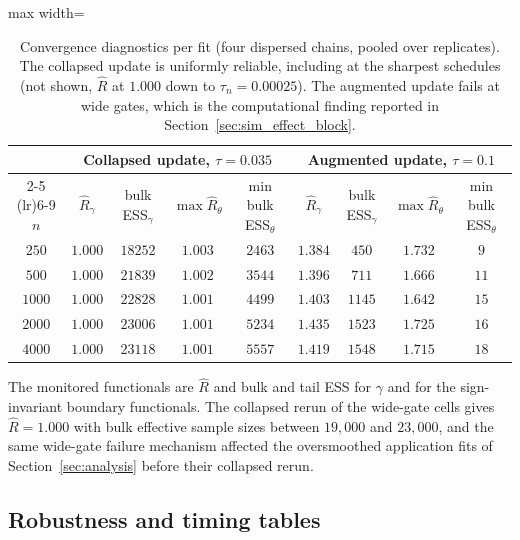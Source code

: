 \documentclass[11pt]{article}
\theoremstyle{definition}
\theoremstyle{plain}
\begin{document}
\begin{table}
  \centering
  \caption{Convergence diagnostics per fit (four dispersed chains, pooled over replicates). The collapsed update is uniformly reliable, including at the sharpest schedules (not shown, $\widehat R$ at $1.000$ down to $\tau_n=0.00025$). The augmented update fails at wide gates, which is the computational finding reported in Section~\ref{sec:sim_effect_block}.}
  \begin{adjustbox}{max width=\textwidth}
  \begin{tabular}{c cccc cccc}
    \toprule
    & \multicolumn{4}{c}{Collapsed update, $\tau=0.035$} & \multicolumn{4}{c}{Augmented update, $\tau=0.1$} \\
    \cmidrule(lr){2-5} \cmidrule(lr){6-9}
    $n$ & $\widehat R_\gamma$ & bulk ESS$_\gamma$ & $\max\widehat R_\theta$ & $\min$ bulk ESS$_\theta$ & $\widehat R_\gamma$ & bulk ESS$_\gamma$ & $\max\widehat R_\theta$ & $\min$ bulk ESS$_\theta$ \\
    \midrule
    $250$  & $1.000$ & $18252$ & $1.003$ & $2463$ & $1.384$ & $450$  & $1.732$ & $9$  \\
    $500$  & $1.000$ & $21839$ & $1.002$ & $3544$ & $1.396$ & $711$  & $1.666$ & $11$ \\
    $1000$ & $1.000$ & $22828$ & $1.001$ & $4499$ & $1.403$ & $1145$ & $1.642$ & $15$ \\
    $2000$ & $1.000$ & $23006$ & $1.001$ & $5234$ & $1.435$ & $1523$ & $1.725$ & $16$ \\
    $4000$ & $1.000$ & $23118$ & $1.001$ & $5557$ & $1.419$ & $1548$ & $1.715$ & $18$ \\
    \bottomrule
  \end{tabular}
  \end{adjustbox}
  \label{tab:sim_diagnostics}
\end{table}

The monitored functionals are $\widehat R$ and bulk and tail ESS for $\gamma$ and for the sign-invariant boundary functionals. The collapsed rerun of the wide-gate cells gives $\widehat R=1.000$ with bulk effective sample sizes between $19{,}000$ and $23{,}000$, and the same wide-gate failure mechanism affected the oversmoothed application fits of Section~\ref{sec:analysis} before their collapsed rerun.

\subsection{Robustness and timing tables}
\label{sec:sim_robust_timing_tables}
\end{document}
